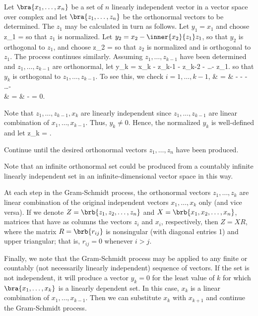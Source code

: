 \begin{algorithm}\label{alg:gram_schmidt_orthonormalization}
Let $\bra{x_1,\dots,x_n}$ be a set of $n$ linearly independent vector in a vector space over complex and let $\bra{z_1,\dots,z_n}$ be the orthonormal vectors to be determined. The $z_1$ may be
calculated in turn as follows. Let $y_1 = x_1$ and choose
\be
z_1 = 
\ee
so that $z_1$ is normalized. Let $y_2 = x_2 - \inner{x_2}{z_1}z_1$, so that $y_2$ is orthogonal to $z_1$, and choose
\be
z_2 = 
\ee
so that $z_2$ is normalized and is orthogonal to $z_1$. %
The process continues similarly. Assuming $z_1,\dots,z_{k-1}$ have been determined and $z_1,\dots,z_{k-1}$ are orthonormal, let
\be
y_k = x_k - z_{k-1} - z_{k-2} - \dots - z_{1}.
\ee
so that $y_k$ is orthogonal to $z_1,\dots,z_{k-1}$. To see this, we check $i = 1,\dots,k-1$,
\beast
{} & = &  -  -  - \dots -  \\
& = &  -  = 0.
\eeast

Note that $z_1,\dots,z_{k-1},x_k$ are linearly independent since $z_1,\dots,z_{k-1}$ are linear combination of $x_1,\dots,x_{k-1}$. Thus, $y_k
\neq 0$. Hence, the normalized $y_k$ is well-defined and let
\be
z_k = .
\ee

Continue until the desired orthonormal vectors $z_1,\dots,z_n$ have been produced.

Note that an infinite orthonormal set could be produced from a countably infinite linearly independent set in an infinite-dimensional vector space in this way.
\end{algorithm}

\begin{remark}
At each step in the Gram-Schmidt process, the orthonormal vectors $z_1,\dots,z_k$ are linear combination of the original independent vectors $x_1,\dots,x_k$ only (and vice versa). If we denote $Z =
\brb{z_1,z_2,\dots,z_n}$ and $X = \brb{x_1,x_2,\dots,x_n}$, matrices that have as columns the vectors $z_i$ and $x_i$, respectively, then $Z = XR$, where the matrix $R = \brb{r_{ij}}$ is nonsingular
(with diagonal entries 1) and upper triangular; that is, $r_{ij} = 0$ whenever $i>j$.

Finally, we note that the Gram-Schmidt process may be applied to any finite or countably (not necessarily linearly independent) sequence of vectors. If the set is not independent, it will produce a
vector $y_k =0$ for the least value of $k$ for which $\bra{x_1,\dots,x_k}$ is a linearly dependent set. In this case, $x_k$ is a linear combination of $x_1,\dots,x_{k-1}$. Then we can substitute
$x_k$ with $x_{k+1}$ and continue the Gram-Schmidt process.
\end{remark}


